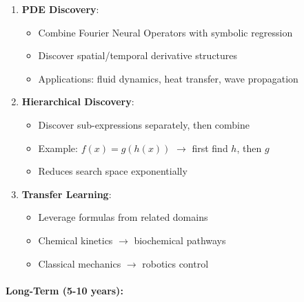 \documentclass[11pt,a4paper]{article}
\begin{document}
\begin{enumerate}
\item \textbf{PDE Discovery}:
   \begin{itemize}
   \item Combine Fourier Neural Operators with symbolic regression
   \item Discover spatial/temporal derivative structures
   \item Applications: fluid dynamics, heat transfer, wave propagation
   \end{itemize}

\item \textbf{Hierarchical Discovery}:
   \begin{itemize}
   \item Discover sub-expressions separately, then combine
   \item Example: $f(x) = g(h(x))$ $\to$ first find $h$, then $g$
   \item Reduces search space exponentially
   \end{itemize}

\item \textbf{Transfer Learning}:
   \begin{itemize}
   \item Leverage formulas from related domains
   \item Chemical kinetics $\to$ biochemical pathways
   \item Classical mechanics $\to$ robotics control
   \end{itemize}
\end{enumerate}

\paragraph{Long-Term (5-10 years):}
\end{document}
